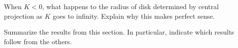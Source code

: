 \documentclass{ximera}
\begin{document}
\begin{problem}
  When $K<0$, what happens to the radius of disk determined by central
  projection as $K$ goes to infinity. Explain why this makes perfect
  sense.
\end{problem}




\begin{problem}
Summarize the results from this section. In particular, indicate which
results follow from the others.
\begin{freeResponse}
\end{freeResponse}
\end{problem}
\end{document}

